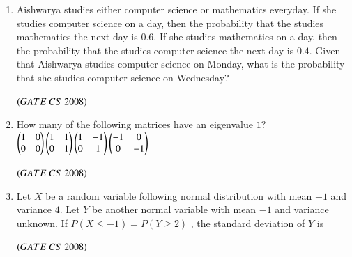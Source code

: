 \documentclass[journal]{IEEEtran}
\numberwithin{equation}{enumi}
\numberwithin{figure}{enumi}
\begin{document}
\begin{enumerate}
\item Aishwarya studies either computer science or mathematics everyday. If she studies computer science on a day, then the probability that the studies mathematics the next day is $0.6$. If she studies mathematics on a day, then the probability that the studies computer science the next day is $0.4$. Given that Aishwarya studies computer science on Monday, what is the probability that she studies computer science on Wednesday?
\begin{enumerate} 
\end{enumerate}
\hfill $\left(GATE\ CS\  2008\right)$

\item How many of the following matrices have an eigenvalue $1$?
$
\begin{pmatrix}1 & 0 \\
0 & 0\end{pmatrix}
\begin{pmatrix}1 & 1 \\
0 & 1\end{pmatrix}
\begin{pmatrix}1 & -1 \\
0 & 1\end{pmatrix}
\begin{pmatrix}-1 & 0 \\
0 & -1\end{pmatrix}
$

\begin{enumerate}
\end{enumerate}
\hfill $\left(GATE\ CS\  2008\right)$

\item Let $X$ be a random variable following normal distribution with mean $+1$ and variance $4$. Let $Y$ be another normal variable with mean $-1$ and variance unknown. If $P(X\leq-1)= P( Y\geq 2)$ , the standard deviation of $Y$ is 
\begin{enumerate}
\end{enumerate}
\hfill $\left(GATE\ CS\  2008\right)$


\end{enumerate}
\end{document}
